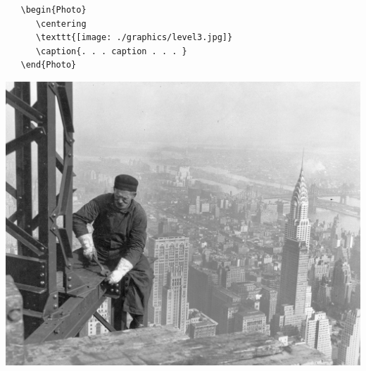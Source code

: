  \begin{Example}
 \begin{verbatim}
   \begin{Photo}
      \centering
      \texttt{[image: ./graphics/level3.jpg]}
      \caption{. . . caption . . . }
   \end{Photo}
\end{verbatim}
\caption{Example using verbatim code}
 \end{Example}

\begin{Photo}
 \centering
 \includegraphics[width=0.85\linewidth]{./images/old-timer-structural-worker.jpg}
\caption{. . . caption . . . }
\end{Photo}


                                             
\begin{plate}[h]
\caption{This is a plate}
 \end{plate}                                             


\begin{painting}[h]
\caption{This is a plate}
 \end{painting} 

